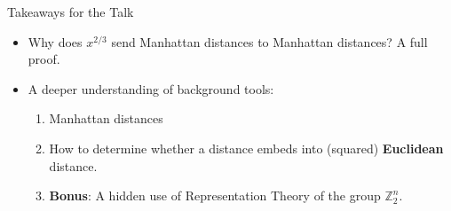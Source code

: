 \begin{frame}{Takeaways for the Talk}
  \begin{itemize}[<+->]
  \item Why does $x^{2/3}$ send Manhattan distances to Manhattan
  distances? A full proof.
  \item A deeper understanding of background tools:
  \begin{enumerate} [<+->]
  \item Manhattan distances
  \item How to determine whether a distance embeds into (squared)
  \textbf{Euclidean} distance.
  \item \textbf{Bonus}: A hidden use of Representation Theory of the
  group $\mathbb{Z}_2^n$.

  \end{enumerate}
  \end{itemize}
\end{frame}

